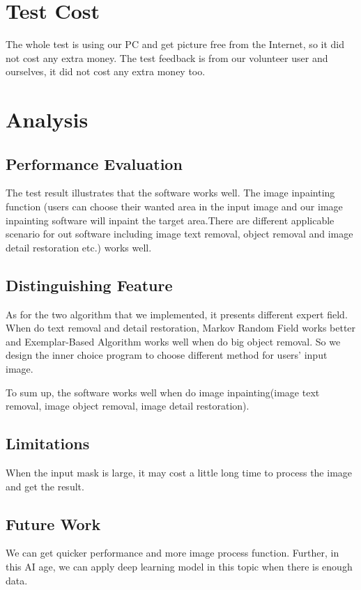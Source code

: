 \documentclass[12pt]{article}
\begin{document}
\section{Test Cost}
\qquad The whole test is using our PC and get picture free from the Internet, so it did not cost any extra money. The test feedback is from our volunteer user and ourselves, it did not cost any extra money too.

\section{Analysis}
\subsection{Performance Evaluation}
\qquad The test result illustrates that the software works well. The image inpainting function (users can choose their wanted area in the input image and our image inpainting software will inpaint the target area.There are different applicable scenario for out software including image text removal, object removal and image detail restoration etc.) works well.

\subsection{Distinguishing Feature}
\qquad As for the two algorithm that we implemented, it presents different expert field. When do text removal and detail restoration, Markov Random Field works better and Exemplar-Based Algorithm works well when do big object removal. So we design the inner choice program to choose different method for users' input image. 

To sum up, the software works well when do image inpainting(image text removal, image object removal, image detail restoration).
\subsection{Limitations}
\qquad When the input mask is large, it may cost a little long time to process the image and get the result.
\subsection{Future Work}
\qquad We can get quicker performance and more image process function. Further, in this AI age, we can apply deep learning model in this topic when there is enough data.
\end{document}
